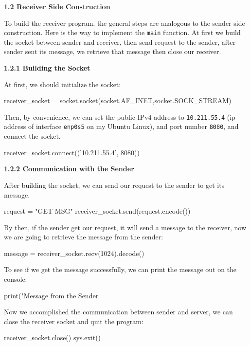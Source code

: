 \documentclass{article}%
\newenvironment{code}%
   {\snugshade\verbatim}%
   {\endverbatim\endsnugshade}
\begin{document}
\begin{Large}
\newpage

\begin{LARGE}
\begin{flushleft}
\textbf{1.2 Receiver Side Construction}
\end{flushleft}
\end{LARGE}

To build the receiver program, the general steps are analogous to the sender side construction. Here is the way to implement the \texttt{main} function. At first we build the socket between sender and receiver, then send request to the sender, after sender sent its message, we retrieve that message then close our receiver.

\begin{flushleft}
\textbf{1.2.1 Building the Socket}
\end{flushleft}

At first, we should initialize the socket:

\begin{code}
    receiver_socket = socket.socket(socket.AF_INET,socket.SOCK_STREAM)
\end{code}

Then, by convenience, we can set the public IPv4 address to \texttt{10.211.55.4} (ip address of interface \texttt{enp0s5} on my Ubuntu Linux), and port number \texttt{8080}, and connect the socket.

\begin{code}
    receiver_socket.connect(('10.211.55.4', 8080))
\end{code}

\begin{flushleft}
\textbf{1.2.2 Communication with the Sender}
\end{flushleft}

After building the socket, we can send our request to the sender to get its message.

\begin{code}
    request = "GET MSG"
    receiver_socket.send(request.encode())
\end{code}

By then, if the sender get our request, it will send a message to the receiver, now we are going to retrieve the message from the sender:

\begin{code}
    message = receiver_socket.recv(1024).decode()
\end{code}

To see if we get the message successfully, we can print the message out on the console:

\begin{code}
    print("Message from the Sender %
\end{code}

Now we accomplished the communication between sender and server, we can close the receiver socket and quit the program:

\begin{code}
    receiver_socket.close()
    sys.exit()
\end{code}

\end{Large}
\newpage
\end{document}

